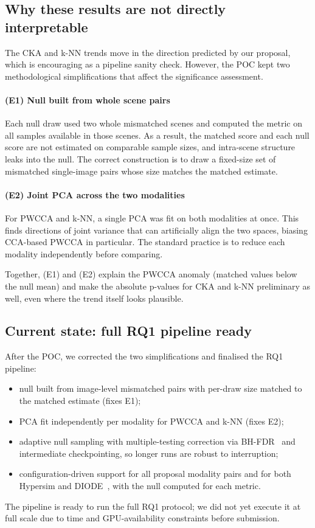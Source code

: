 \documentclass[10pt,conference,compsocconf]{IEEEtran}
\begin{document}
\subsection{Why these results are not directly interpretable}
\label{sec:errors}
The CKA and k-NN trends move in the direction predicted by our
proposal, which is encouraging as a pipeline sanity check. However,
the POC kept two methodological simplifications that affect the
significance assessment.

\paragraph{(E1) Null built from whole scene pairs}
Each null draw used two whole mismatched scenes and computed the
metric on all samples available in those scenes. As a result, the
matched score and each null score are not estimated on comparable
sample sizes, and intra-scene structure leaks into the null. The
correct construction is to draw a fixed-size set of mismatched
single-image pairs whose size matches the matched estimate.

\paragraph{(E2) Joint PCA across the two modalities}
For PWCCA and k-NN, a single PCA was fit on both modalities at once.
This finds directions of joint variance that can artificially align
the two spaces, biasing CCA-based PWCCA in particular. The standard
practice is to reduce each modality independently before comparing.

Together, (E1) and (E2) explain the PWCCA anomaly (matched values
below the null mean) and make the absolute p-values for CKA and k-NN
preliminary as well, even where the trend itself looks plausible.

\subsection{Current state: full RQ1 pipeline ready}
After the POC, we corrected the two simplifications and finalised the
RQ1 pipeline:
\begin{itemize}\itemsep0pt
  \item null built from image-level mismatched pairs with per-draw
        size matched to the matched estimate (fixes E1);
  \item PCA fit independently per modality for PWCCA and k-NN
        (fixes E2);
  \item adaptive null sampling with multiple-testing correction via
        BH-FDR~\cite{bh1995} and intermediate checkpointing, so longer
        runs are robust to interruption;
  \item configuration-driven support for all proposal modality pairs
        and for both Hypersim and DIODE~\cite{diode}, with the null
        computed for each metric.
\end{itemize}
The pipeline is ready to run the full RQ1 protocol; we did not yet
execute it at full scale due to time and GPU-availability constraints
before submission.
\end{document}
